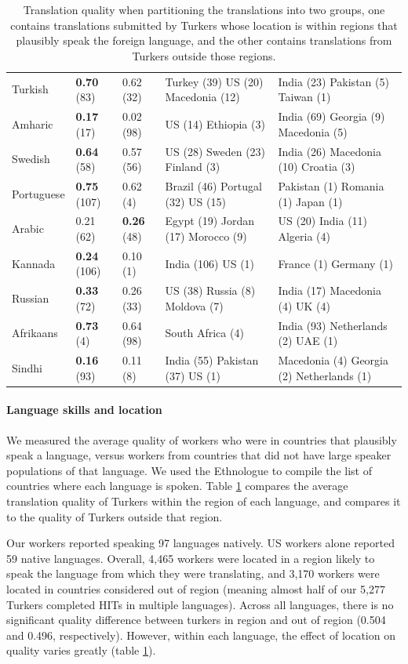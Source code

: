 \documentclass[11pt]{article}
\begin{document}
\begin{table}[h]
\begin{tabular}{lllll}
Turkish&\textbf{0.70} (83)&0.62 (32)&Turkey (39) US (20) Macedonia (12) &India (23) Pakistan (5) Taiwan (1) \\
Amharic&\textbf{0.17} (17)&0.02 (98)&US (14) Ethiopia (3) &India (69) Georgia (9) Macedonia (5) \\
Swedish&\textbf{0.64} (58)&0.57 (56)&US (28) Sweden (23) Finland (3) &India (26) Macedonia (10) Croatia (3) \\
Portuguese&\textbf{0.75} (107)&0.62 (4)&Brazil (46) Portugal (32) US (15) &Pakistan (1) Romania (1) Japan (1) \\
Arabic&0.21 (62) &\textbf{0.26} (48)&Egypt (19) Jordan (17) Morocco (9) &US (20) India (11) Algeria (4) \\
Kannada&\textbf{0.24} (106)&0.10 (1)&India (106) US (1) &France (1) Germany (1) \\
Russian&\textbf{0.33} (72)&0.26 (33)&US (38) Russia (8) Moldova (7) &India (17) Macedonia (4) UK (4) \\
Afrikaans&\textbf{0.73} (4)&0.64 (98)&South Africa (4) &India (93) Netherlands (2) UAE (1) \\
Sindhi&\textbf{0.16} (93)&0.11 (8)&India (55) Pakistan (37) US (1) &Macedonia (4) Georgia (2) Netherlands (1) \\
\hline\hline
\end{tabular}
\caption{Translation quality when partitioning the translations into two groups, one contains translations submitted by Turkers whose location is within regions that plausibly speak the foreign language, and the other contains translations from Turkers outside those regions.  }\label{region-summary}
\end{table}


\paragraph{Language skills and location}

We measured the average quality of workers who were in countries that plausibly speak a language, versus workers from countries that did not have large speaker populations of that language.  We used the Ethnologue \cite{ethnologue} to compile the list of countries where each language is spoken.  Table \ref{region-summary} compares the average translation quality of Turkers within the region of each language, and compares it to the quality of Turkers outside that region. 

Our workers reported speaking 97 languages natively. US workers alone reported 59 native languages. Overall, 4,465 workers were located in a region likely to speak the language from which they were translating, and 3,170 workers were located in countries considered out of region (meaning almost half of our 5,277 Turkers completed HITs in multiple languages). Across all languages, there is no significant quality difference between turkers in region and out of region (0.504 and 0.496, respectively). However, within each language, the effect of location on quality varies greatly (table \ref{region-summary}). 
\end{document}
